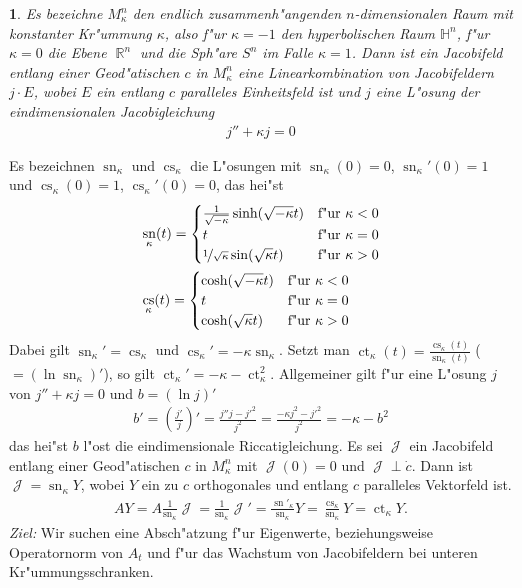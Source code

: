 \documentclass[paper=A4, twoside, chapterprefix=true, bibliography=totoc, headsepline]{scrbook}
\DeclareMathOperator{\R}{\mathbb{R}}
\renewcommand{\H}{\ensuremath{\mathbb{H}}}
\DeclareMathOperator{\calJ}{\mathcal{J}}
\DeclareMathOperator{\cs}{cs}       %
\DeclareMathOperator{\ct}{ct}       %
\DeclareMathOperator{\sn}{sn}       %
\theoremstyle{plain}
\theoremstyle{nonumberplain}
\theoremstyle{empty}
\newtheorem{emptythm}{}%
\theoremstyle{break}
\begin{document}
\begin{emptythm}
  Es bezeichne $M_\kappa^n$ den endlich zusammenh"angenden $n$-dimensionalen Raum  mit konstanter Kr"ummung $\kappa$, also f"ur $\kappa = -1$ den hyperbolischen Raum $\H^n$, f"ur $\kappa = 0$ die Ebene $\R^n$ und die Sph"are $S^n$ im Falle $\kappa = 1$.
  Dann ist ein Jacobifeld entlang einer Geod"atischen $c$ in $M_\kappa^n$ eine Linearkombination von Jacobifeldern $j \cdot E$, wobei $E$ ein entlang $c$ paralleles Einheitsfeld ist und $j$ eine L"osung der eindimensionalen Jacobigleichung
  \begin{align*}
    j'' + \kappa j = 0
  \end{align*}\end{emptythm}

Es bezeichnen $\sn_\kappa$ und $\cs_\kappa$ die L"osungen mit $\sn_\kappa(0) = 0$, $\sn_\kappa'(0) = 1$ und $\cs_\kappa(0) = 1$, $\cs_\kappa'(0) = 0$, das hei"st
\begin{align*}
  &\sn_\kappa(t) = \begin{cases}
    \frac{1}{\sqrt{-\kappa}} \sinh(\sqrt{-\kappa}t) & \text{f"ur } \kappa < 0\\
    t & \text{f"ur } \kappa = 0\\
    \nicefrac{1}{\sqrt{\kappa}} \sin(\sqrt{\kappa}t) & \text{f"ur } \kappa > 0\\
  \end{cases}\\
  &\cs_\kappa(t) = \begin{cases}
    \cosh(\sqrt{-\kappa}t) & \text{f"ur } \kappa < 0\\
    t & \text{f"ur } \kappa = 0\\
    \cosh(\sqrt{\kappa}t) & \text{f"ur } \kappa > 0\\
  \end{cases}
\end{align*}
Dabei gilt $\sn_\kappa' = \cs_\kappa$ und $\cs_\kappa' = -\kappa \sn_\kappa$. Setzt man $\ct_\kappa(t) = \frac{\cs_\kappa(t)}{\sn_\kappa(t)}$ ($= (\ln \sn_\kappa)'$), so gilt $\ct_\kappa' = -\kappa - \ct_\kappa^2$. Allgemeiner gilt f"ur eine L"osung $j$ von $j'' + \kappa j = 0$ und $b = (\ln j)'$
\begin{align*}
  b' = \left( \frac{j'}{j} \right)' = \frac{j''j - {j'}^2}{j^2} = \frac{-\kappa j^2 - {j'}^2}{j^2} = -\kappa - b^2
\end{align*}
das hei"st $b$ l"ost die eindimensionale Riccatigleichung.
Es sei $\calJ$ ein Jacobifeld entlang einer Geod"atischen $c$ in $M^n_{\kappa}$ mit $\calJ(0) = 0$ und $\calJ \perp \dot c$.
Dann ist $\calJ = \sn_{\kappa}Y$, wobei $Y$ ein zu $c$ orthogonales und entlang $c$ paralleles Vektorfeld ist.
\begin{align*}
  AY = A \frac{1}{\sn_{\kappa}}\calJ
  = \frac{1}{\sn_{\kappa}}\calJ'
  = \frac{\sn'_{\kappa}}{\sn_{\kappa}}Y
  = \frac{\cs_{\kappa}}{\sn_{\kappa}}Y
  = \ct_{\kappa}Y.
\end{align*}
\emph{Ziel:} Wir suchen eine Absch"atzung f"ur Eigenwerte, beziehungsweise Operatornorm von $A_t$ und f"ur das Wachstum von Jacobifeldern bei unteren Kr"ummungsschranken.
\end{document}
